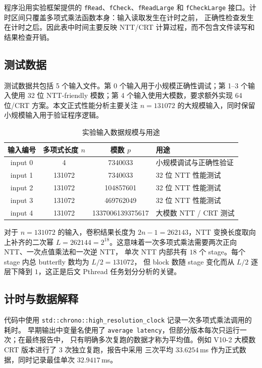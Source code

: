 \documentclass[UTF8,a4paper,10pt]{ctexart}
\begin{document}
程序沿用实验框架提供的 \texttt{fRead}、\texttt{fCheck}、\texttt{fReadLarge} 和
\texttt{fCheckLarge} 接口。计时区间只覆盖多项式乘法函数本身：输入读取发生在计时之前，
正确性检查发生在计时之后。因此表中时间主要反映 NTT/CRT 计算过程，而不包含文件读写和结果检查开销。

\subsection{测试数据}

测试数据共包括 5 个输入文件。第 0 个输入用于小规模正确性调试；第 1--3 个输入使用 32 位
NTT-friendly 模数；第 4 个输入使用大模数，要求额外实现 64 位/CRT 方案。本文正式性能分析主要关注
$n=131072$ 的大规模输入，同时保留小规模输入用于验证程序逻辑。

\begin{table}[H]
  \centering
  \begin{tabular}{cccl}
  \toprule
  \textbf{输入编号} & \textbf{多项式长度 $n$} & \textbf{模数 $p$} & \textbf{用途}\\
  \midrule
  input 0 & 4      & 7340033              & 小规模调试与正确性验证\\
  input 1 & 131072 & 7340033              & 32 位 NTT 性能测试\\
  input 2 & 131072 & 104857601            & 32 位 NTT 性能测试\\
  input 3 & 131072 & 469762049            & 32 位 NTT 性能测试\\
  input 4 & 131072 & 1337006139375617     & 大模数 NTT / CRT 测试\\
  \bottomrule
  \end{tabular}
  \caption{实验输入数据规模与用途}
  \label{tab:dataset}
\end{table}

对于 $n=131072$ 的输入，卷积结果长度为 $2n-1=262143$，NTT 变换长度取向上补齐的二次幂
$L=262144=2^{18}$。这意味着一次多项式乘法需要两次正向 NTT、一次点值乘法和一次逆 NTT，
单次 NTT 内部共有 $18$ 个 stage。每个 stage 内总 butterfly 数均为 $L/2=131072$，
但 block 数随 stage 变化而从 $L/2$ 逐层下降到 $1$，这正是后文 Pthread 任务划分分析的关键。

\subsection{计时与数据解释}

代码中使用 \texttt{std::chrono::high\_resolution\_clock} 记录一次多项式乘法调用的耗时。
早期输出中变量名使用了 \texttt{average latency}，但部分版本每次只运行一次；在最终报告中，
只有明确多次复跑的数据才称为平均值。例如 V10-2 大模数 CRT 版本进行了 3 次独立复跑，报告中采用
三次平均 $33.6254$\,ms 作为正式数据，同时记录最佳单次 $32.9417$\,ms。
\end{document}
